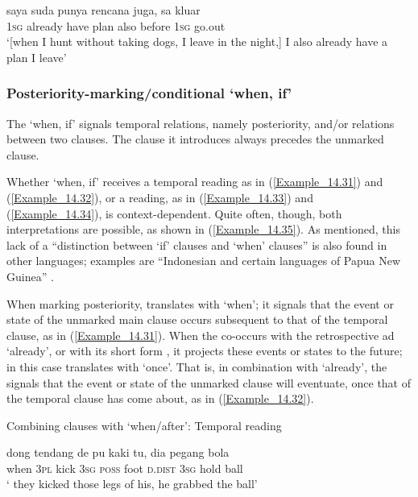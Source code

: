 \ea\label{Example_14.30}
\gll {\ldots} {saya} {suda} {punya} {rencana} {juga,} {} {sa} {kluar}\\ %
  {} \textsc{1sg}  already  have  plan  also  before  \textsc{1sg} go.out\\
\glt ‘[when I hunt without taking dogs, I leave in the night,] I also already have a plan  I leave’ \textstyleExampleSource{[080919-004-NP.0002]}
\z

\subsubsection[Posteriority{}-marking/{conditional} kalo ‘when, if’]{Posteriority{}-marking/{conditional}  ‘when, if’}
\label{Para_14.2.3.5}
The   ‘when, if’ signals temporal relations, namely posteriority, and/or  relations between two clauses. The clause it introduces always precedes the unmarked clause.



Whether  ‘when, if’ receives a temporal reading as in (\ref{Example_14.31}) and (\ref{Example_14.32}), or a  reading, as in (\ref{Example_14.33}) and (\ref{Example_14.34}), is context-dependent. Quite often, though, both interpretations are possible, as shown in (\ref{Example_14.35}). As mentioned, this lack of a “distinction between ‘if’ clauses and ‘when’ clauses” is also found in other languages; examples are “Indonesian and certain languages of Papua New Guinea” \citep[257]{Thompson.2007}.
%


When marking posteriority,  translates with ‘when’; it signals that the event or state of the unmarked main clause occurs subsequent to that of the temporal clause, as in (\ref{Example_14.31}). When the  co-occurs with the retrospective ad  ‘already’, or with its short form , it projects these events or states to the future; in this case  translates with ‘once’. That is, in combination with  ‘already’, the  signals that the event or state of the unmarked clause will eventuate, once that of the temporal clause has come about, as in (\ref{Example_14.32}).
%
\begin{styleExampleTitle}
Combining clauses with  ‘when/after’: Temporal reading
\end{styleExampleTitle}
\ea\label{Example_14.31}
 {dong} {tendang} {de} {pu} {kaki} {tu,} {dia} {pegang} {bola}\\ %
 when  \textsc{3pl}  kick  \textsc{3sg}  \textsc{poss}  foot  \textsc{d.dist}  \textsc{3sg}  hold  ball\\
 ‘ they kicked those legs of his, he grabbed the ball’ \textstyleExampleSource{[081006-014-Cv.0004]}
\z

